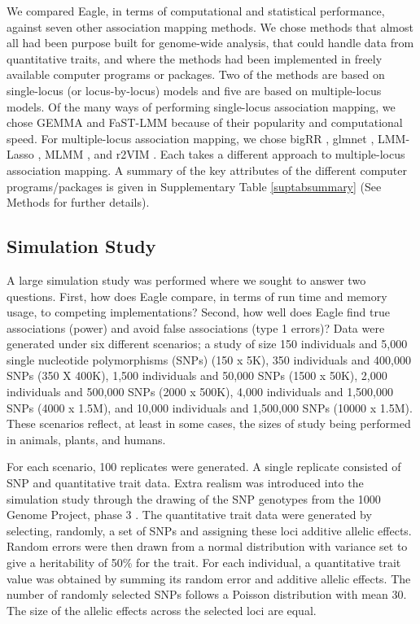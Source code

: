 \documentclass{article}
\begin{document}
We compared Eagle, in terms of computational and statistical performance, against seven other association mapping methods. 
We chose methods that almost all had been purpose built for genome-wide analysis, that could handle data from quantitative traits, and where the methods had been implemented in freely available computer programs or packages. Two of the methods are based on single-locus (or locus-by-locus) models and five are based on multiple-locus models. Of the many ways of performing single-locus association mapping, we chose 
GEMMA \cite{zhou2012genome}  and FaST-LMM \cite{lippert2011fast} because of their popularity and computational speed. 
For multiple-locus association mapping, we chose bigRR \cite{shen2013novel}, glmnet \cite{Friedman2010glmnet}, 
LMM-Lasso \cite{rakitsch2013lasso}, MLMM \cite{segura2012efficient} , and r2VIM \cite{szymczak2016r2vim}.  
Each takes a different approach to multiple-locus association mapping. A summary of the key attributes of the different computer programs/packages 
is given in Supplementary Table \ref{suptabsummary} (See Methods for further details). 

 

\subsection{Simulation Study}
A large simulation study was performed where we sought to  answer two questions. 
First, how does Eagle compare, in terms of run time and memory usage, to 
competing implementations? Second, how well does Eagle find true associations (power) and avoid 
false associations (type 1 errors)? Data were generated under six different scenarios; a study of size 150 individuals 
and 5,000 single nucleotide polymorphisms (SNPs) (150 x 5K),  350 individuals and 400,000 SNPs (350 X 400K),  1,500 individuals and 
50,000 SNPs (1500 x 50K), 2,000 individuals and 500,000 SNPs (2000 x 500K), 4,000 individuals and 
1,500,000 SNPs (4000 x 1.5M), and 10,000 individuals and 1,500,000 SNPs (10000 x 1.5M).   
These scenarios reflect, at least in some cases, the sizes of study being performed in animals, plants, and humans.  

For each scenario, 100 replicates were generated. A single replicate consisted of SNP and quantitative trait data. 
Extra realism was introduced into the simulation study through the drawing of the SNP genotypes from the 1000 Genome Project, phase 3  \cite{10002010map}.
 The quantitative trait data were generated 
by selecting, randomly, a set of SNPs and assigning these loci additive allelic effects.  Random errors were then drawn from a normal distribution 
with variance set to give a heritability of 50\% for the trait. 
For each individual, a quantitative trait value was obtained by summing its random error and additive allelic effects. 
The number of randomly selected SNPs follows a Poisson distribution with mean 30. The size of the allelic effects 
 across the selected loci are equal.  
 
\end{document}
